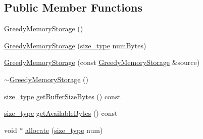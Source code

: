 \subsection*{Public Member Functions}
\begin{DoxyCompactItemize}
\item 
\hyperlink{classuva_1_1utils_1_1containers_1_1_greedy_memory_storage_a0985c36ece59f76a31e787d0e9da6f89}{Greedy\+Memory\+Storage} ()
\item 
\hyperlink{classuva_1_1utils_1_1containers_1_1_greedy_memory_storage_a095471179cc14c9ed7cec893e51e5161}{Greedy\+Memory\+Storage} (\hyperlink{classuva_1_1utils_1_1containers_1_1_greedy_memory_storage_a750d36c7e6c18135ccc45bf105f860e5}{size\+\_\+type} num\+Bytes)
\item 
\hyperlink{classuva_1_1utils_1_1containers_1_1_greedy_memory_storage_a344f413a965d6c9ec0863b3a55a6bbc5}{Greedy\+Memory\+Storage} (const \hyperlink{classuva_1_1utils_1_1containers_1_1_greedy_memory_storage}{Greedy\+Memory\+Storage} \&source)
\item 
\hyperlink{classuva_1_1utils_1_1containers_1_1_greedy_memory_storage_ab1e6ca470c3552106c01569c08a4d32c}{$\sim$\+Greedy\+Memory\+Storage} ()
\item 
\hyperlink{classuva_1_1utils_1_1containers_1_1_greedy_memory_storage_a750d36c7e6c18135ccc45bf105f860e5}{size\+\_\+type} \hyperlink{classuva_1_1utils_1_1containers_1_1_greedy_memory_storage_abc629a3a1b93fbca4bfadcef7687b847}{get\+Buffer\+Size\+Bytes} () const 
\item 
\hyperlink{classuva_1_1utils_1_1containers_1_1_greedy_memory_storage_a750d36c7e6c18135ccc45bf105f860e5}{size\+\_\+type} \hyperlink{classuva_1_1utils_1_1containers_1_1_greedy_memory_storage_a10915a9890898e7245fd3f434102153f}{get\+Available\+Bytes} () const 
\item 
void $\ast$ \hyperlink{classuva_1_1utils_1_1containers_1_1_greedy_memory_storage_abdc13691eaca2fcb70d7398c1dcd6c05}{allocate} (\hyperlink{classuva_1_1utils_1_1containers_1_1_greedy_memory_storage_a750d36c7e6c18135ccc45bf105f860e5}{size\+\_\+type} num)
\end{DoxyCompactItemize}
